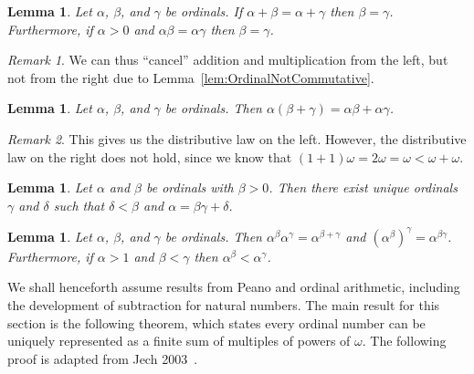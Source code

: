 \documentclass[a4paper,11pt]{article}
\theoremstyle{plain}
\newtheorem{lem}[thm]{Lemma}
\theoremstyle{definition}
\theoremstyle{remark}
\newtheorem*{rem}{Remark}
\begin{document}
\begin{lem}
Let $\alpha$, $\beta$, and $\gamma$ be ordinals. If $\alpha + \beta = \alpha + \gamma$ then $\beta = \gamma$. Furthermore, if $\alpha > 0$ and $\alpha\beta = \alpha\gamma$ then $\beta = \gamma$.
\end{lem}
\begin{rem}
We can thus ``cancel'' addition and multiplication from the left, but not from the right due to Lemma~\ref{lem:OrdinalNotCommutative}.
\end{rem}

\begin{lem}
Let $\alpha$, $\beta$, and $\gamma$ be ordinals. Then $\alpha(\beta+\gamma) = \alpha\beta + \alpha\gamma$.
\end{lem}
\begin{rem}
This gives us the distributive law on the left. However, the distributive law on the right does not hold, since we know that $(1+1)\omega = 2\omega = \omega < \omega + \omega$.
\end{rem}

\begin{lem}
\label{lem:OrdinalDivision}
Let $\alpha$ and $\beta$ be ordinals with $\beta > 0$. Then there exist unique ordinals $\gamma$ and $\delta$ such that $\delta < \beta$ and $\alpha = \beta\gamma + \delta$.
\end{lem}

\begin{lem}
Let $\alpha$, $\beta$, and $\gamma$ be ordinals. Then $\alpha^\beta \alpha^\gamma = \alpha^{\beta + \gamma}$ and $(\alpha^\beta)^\gamma = \alpha^{\beta\gamma}$. Furthermore, if $\alpha > 1$ and $\beta < \gamma$ then $\alpha^\beta < \alpha^\gamma$.
\end{lem}

We shall henceforth assume results from Peano and ordinal arithmetic, including the development of subtraction for natural numbers. The main result for this section is the following theorem, which states every ordinal number can be uniquely represented as a finite sum of multiples of powers of $\omega$. The following proof is adapted from Jech 2003~\citep[p. 24]{JechBook}.
\end{document}
